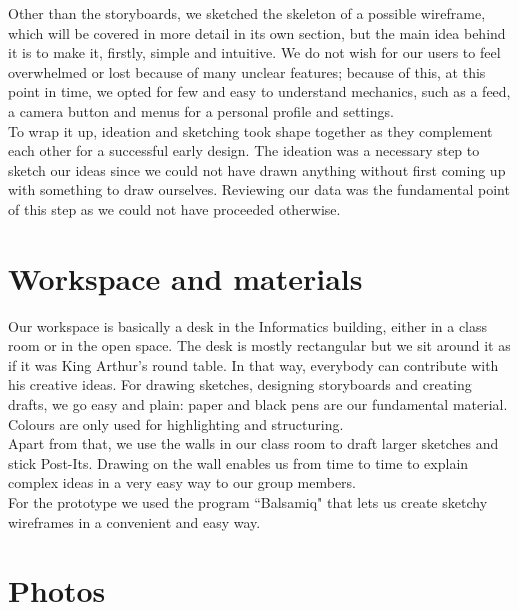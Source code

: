 \documentclass[12pt]{scrartcl}
\begin{document}
	Other than the storyboards, we sketched the skeleton of a possible wireframe, which will be
	covered in more detail in its own section, but the main idea behind it is to make it, firstly,
	simple and intuitive. We do not wish for our users to feel overwhelmed or lost because of
	many unclear features; because of this, at this point in time, we opted for few and easy to
	understand mechanics, such as a feed, a camera button and menus for a personal profile and
	settings.\\
	
	To wrap it up, ideation and sketching took shape together as they complement each other for
	a successful early design. The ideation was a necessary step to sketch our ideas since we
	could not have drawn anything without first coming up with something to draw ourselves.
	Reviewing our data was the fundamental point of this step as we could not have proceeded
	otherwise.\\
	

\section{Workspace and materials}

	
	Our workspace is basically a desk in the Informatics building, either in a class room or in the open space. The desk is mostly rectangular 
	but we sit around it as if it was King Arthur's round table. In that way, everybody can contribute with his creative ideas. For drawing sketches, 
	designing storyboards and creating drafts, we go easy and plain: paper and black pens are our fundamental material. 
	Colours are only used for highlighting and structuring.\\
	
	Apart from that, we use the walls in our class room to draft larger sketches and stick Post-Its. Drawing on the wall enables us from time to time to explain 
	complex ideas in a very easy way to our group members.\\
	
	For the prototype we used the program ``Balsamiq" that lets us create sketchy wireframes in a convenient and easy way.\\
	
	
\section{Photos}
\end{document}
